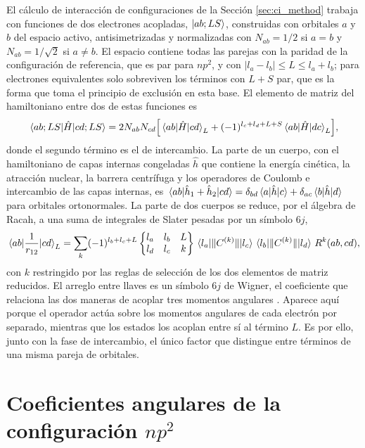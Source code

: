 El cálculo de interacción de configuraciones de la Sección \ref{sec:ci_method} trabaja con funciones de dos electrones acopladas, $\ket{ab;LS}$, construidas con orbitales $a$ y $b$ del espacio activo, antisimetrizadas y normalizadas con $N_{ab} = 1/2$ si $a = b$ y $N_{ab} = 1/\sqrt{2}$ si $a \neq b$. El espacio contiene todas las parejas con la paridad de la configuración de referencia, que es par para $np^2$, y con $|l_a - l_b| \le L \le l_a + l_b$; para electrones equivalentes solo sobreviven los términos con $L + S$ par, que es la forma que toma el principio de exclusión en esta base. El elemento de matriz del hamiltoniano entre dos de estas funciones es
\begin{equation}
    \mel{ab;LS}{\hat{H}}{cd;LS} = 2 N_{ab} N_{cd} \qty[ \mel{ab}{\hat{H}}{cd}_L + (-1)^{l_c + l_d + L + S} \mel{ab}{\hat{H}}{dc}_L ],
\end{equation}
donde el segundo término es el de intercambio. La parte de un cuerpo, con el hamiltoniano de capas internas congeladas $\hat{h}$ que contiene la energía cinética, la atracción nuclear, la barrera centrífuga y los operadores de Coulomb e intercambio de las capas internas, es $\mel{ab}{\hat{h}_1 + \hat{h}_2}{cd} = \delta_{bd}\mel{a}{\hat{h}}{c} + \delta_{ac}\mel{b}{\hat{h}}{d}$ para orbitales ortonormales. La parte de dos cuerpos se reduce, por el álgebra de Racah, a una suma de integrales de Slater pesadas por un símbolo $6j$,
\begin{equation}
    \mel{ab}{\frac{1}{r_{12}}}{cd}_L = \sum_k (-1)^{l_b + l_c + L} \begin{Bmatrix} l_a & l_b & L \\ l_d & l_c & k \end{Bmatrix} \mel{l_a}{\|C^{(k)}\|}{l_c} \mel{l_b}{\|C^{(k)}\|}{l_d}\, R^k(ab,cd),
\end{equation}
con $k$ restringido por las reglas de selección de los dos elementos de matriz reducidos. El arreglo entre llaves es un símbolo $6j$ de Wigner, el coeficiente que relaciona las dos maneras de acoplar tres momentos angulares \parencite{Edmonds1957}. Aparece aquí porque el operador actúa sobre los momentos angulares de cada electrón por separado, mientras que los estados los acoplan entre sí al término $L$. Es por ello, junto con la fase de intercambio, el único factor que distingue entre términos de una misma pareja de orbitales.

\section{Coeficientes angulares de la configuración \texorpdfstring{$np^2$}{np2}}
\label{sec:coef_angulares_np2}

